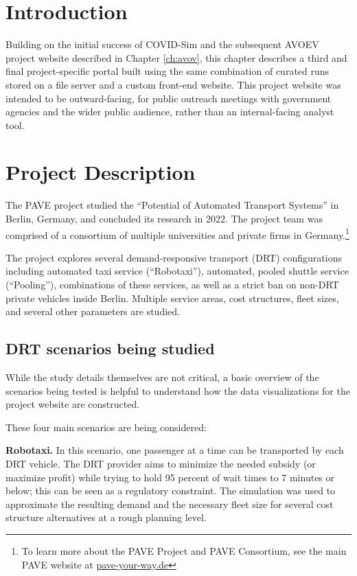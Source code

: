 \section{Introduction}
\label{pave-intro}

Building on the initial success of COVID-Sim and the subsequent AVOEV project website described in Chapter \ref{ch:avov}, this chapter describes a third and final project-specific portal built using the same combination of curated runs stored on a file server and a custom front-end website. This project website was intended to be outward-facing, for public outreach meetings with government agencies and the wider public audience, rather than an internal-facing analyst tool.

\section{Project Description}
\label{pave-project-description}

The \gls{PAVE} project studied the ``Potential of Automated Transport Systems'' in Berlin, Germany, and concluded its research in 2022. The project team was comprised of a consortium of multiple universities and private firms in Germany.\footnote{To learn more about the PAVE Project and PAVE Consortium, see the main PAVE website at \href{https://pave-your-way.de}{pave-your-way.de}}

The project explores several demand-responsive transport (\gls{DRT}) configurations including automated taxi service (``Robotaxi''), automated, pooled shuttle service (``Pooling''), combinations of these services, as well as a strict ban on non-DRT private vehicles inside Berlin. Multiple service areas, cost structures, fleet sizes, and several other parameters are studied.

\subsection{DRT scenarios being studied}
\label{pave-scenarios}

While the study details themselves are not critical, a basic overview of the scenarios being tested is helpful to understand how the data visualizations for the project website are constructed.

These four main scenarios are being considered:

\textbf{Robotaxi.} In this scenario, one passenger at a time can be transported by each DRT vehicle. The DRT provider aims to minimize the needed subsidy (or maximize profit) while trying to hold 95 percent of wait times to 7 minutes or below; this can be seen as a regulatory constraint. The simulation was used to approximate the resulting demand and the necessary fleet size for several cost structure alternatives at a rough planning level.

